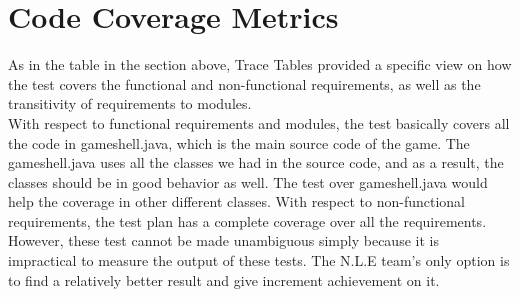 \documentclass[12pt, titlepage]{article}
\begin{document}
\section{Code Coverage Metrics}
 As in the table in the section above, Trace Tables provided a specific view on how the test covers the functional and non-functional requirements, as well as the transitivity of requirements to modules.\\
 With respect to functional requirements and modules, the test basically covers all the code in gameshell.java, which is the main source code of the game. The gameshell.java uses all the classes we had in the source code, and as a result, the classes should be in good behavior as well. The test over gameshell.java would help the coverage in other different classes.
 With respect to non-functional requirements, the test plan has a complete coverage over all the requirements. However, these test cannot be made unambiguous simply because it is impractical to measure the output of these tests. The N.L.E team's only option is to find a relatively better result and give increment achievement on it.
 
 



\end{document}
